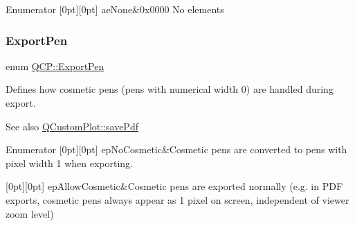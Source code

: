 \begin{DoxyEnumFields}{Enumerator}
[0pt][0pt]{}\mbox{\label{namespaceQCP_ae55dbe315d41fe80f29ba88100843a0caa9e90d81896358757d94275aeaa58f6a}} 
ae\+None&{\ttfamily 0x0000} No elements \\
\hline

\end{DoxyEnumFields}
\mbox{\label{namespaceQCP_a17844f19e1019693a953e1eb93536d2f}} 
\subsubsection{\texorpdfstring{Export\+Pen}{ExportPen}}
{\footnotesize\ttfamily enum \hyperlink{namespaceQCP_a17844f19e1019693a953e1eb93536d2f}{Q\+C\+P\+::\+Export\+Pen}}

Defines how cosmetic pens (pens with numerical width 0) are handled during export.

\begin{DoxySeeAlso}{See also}
\hyperlink{classQCustomPlot_ad5acd34f6b39c3516887d7e54fec2412}{Q\+Custom\+Plot\+::save\+Pdf} 
\end{DoxySeeAlso}
\begin{DoxyEnumFields}{Enumerator}
[0pt][0pt]{}\mbox{\label{namespaceQCP_a17844f19e1019693a953e1eb93536d2faae8fcfaafee234ce18558afef83f6a78}} 
ep\+No\+Cosmetic&Cosmetic pens are converted to pens with pixel width 1 when exporting. \\
\hline

[0pt][0pt]{}\mbox{\label{namespaceQCP_a17844f19e1019693a953e1eb93536d2fa50d3657dba3fb90560b93a823cb0a6e8}} 
ep\+Allow\+Cosmetic&Cosmetic pens are exported normally (e.\+g. in P\+DF exports, cosmetic pens always appear as 1 pixel on screen, independent of viewer zoom level) \\
\hline

\end{DoxyEnumFields}
\mbox{\label{namespaceQCP_a2ad6bb6281c7c2d593d4277b44c2b037}} 
